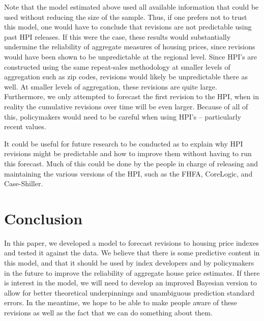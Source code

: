 \documentclass[AER]{AEA}
\begin{document}
Note that the model estimated above used all available information that could be used without reducing the size of the sample. Thus, if one prefers not to trust this model, one would have to conclude that revisions are not predictable using past HPI releases. If this were the case, these results would substantially undermine the reliability of aggregate measures of housing prices, since revisions would have been shown to be unpredictable at the regional level. Since HPI's are constructed using the same repeat-sales methodology at smaller levels of aggregation such as zip codes, revisions would likely be unpredictable there as well. At smaller levels of aggregation, these revisions are quite large. Furthermore, we only attempted to forecast the first revision to the HPI, when in reality the cumulative revisions over time will be even larger. Because of all of this, policymakers would need to be careful when using HPI's -- particularly recent values. 

It could be useful for future research to be conducted as to explain why HPI revisions might be predictable and how to improve them without having to  run  this forecast. Much of this could be done by the people in charge of releasing and maintaining the various versions of the HPI, such as the FHFA, CoreLogic, and Case-Shiller.

\section{Conclusion}

In this paper, we developed a model to forecast revisions to housing price indexes and tested it against the data. We believe that there is some predictive content in this model, and that it should be used by index developers and by policymakers in the future to improve the reliability of aggregate house price estimates. If there is interest in the model, we will need to develop an improved Bayesian version to allow for better theoretical underpinnings and  unambiguous prediction standard errors. In the meantime, we hope to be able to make people aware of these revisions as well as the fact that we can do something about them.


\newpage

\end{document}
